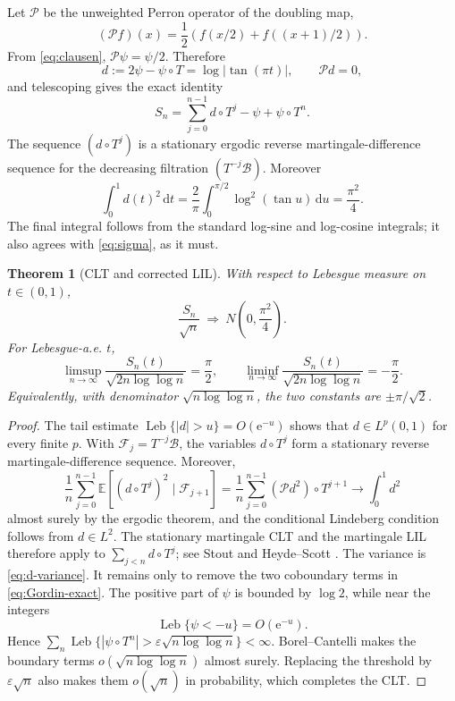 \documentclass[11pt,oneside]{article}
\newtheorem{theorem}{Theorem}[section]
\theoremstyle{definition}
\theoremstyle{remark}
\newcommand{\e}{\mathrm e}
\newcommand{\dd}{\,\mathrm d}
\begin{document}
Let $\mathcal P$ be the unweighted Perron operator of the doubling map,
\[
 (\mathcal P f)(x)=\frac12\left(f(x/2)+f((x+1)/2)\right).
\]
From \eqref{eq:clausen}, $\mathcal P\psi=\psi/2$.  Therefore
\begin{equation}
 d:=2\psi-\psi\circ T=\log|\tan(\pi t)|,
 \qquad \mathcal P d=0,
 \label{eq:martingale-difference}
\end{equation}
and telescoping gives the exact identity
\begin{equation}
 S_n=\sum_{j=0}^{n-1}d\circ T^j-\psi+\psi\circ T^n.
 \label{eq:Gordin-exact}
\end{equation}
The sequence $(d\circ T^j)$ is a stationary ergodic reverse martingale-difference sequence
for the decreasing filtration $(T^{-j}\mathcal B)$.  Moreover
\begin{equation}
 \int_0^1d(t)^2\dd t
 =\frac2\pi\int_0^{\pi/2}\log^2(\tan u)\dd u
 =\frac{\pi^2}{4}.
 \label{eq:d-variance}
\end{equation}
The final integral follows from the standard log-sine and log-cosine integrals; it also
agrees with \eqref{eq:sigma}, as it must.

\begin{theorem}[CLT and corrected LIL]
\label{thm:correct-lil}
With respect to Lebesgue measure on $t\in(0,1)$,
\begin{equation}
 \frac{S_n}{\sqrt n}\ \Longrightarrow\
 N\!\left(0,\frac{\pi^2}{4}\right).
 \label{eq:CLT}
\end{equation}
For Lebesgue-a.e. $t$,
\begin{equation}
 \limsup_{n\to\infty}\frac{S_n(t)}{\sqrt{2n\log\log n}}=\frac\pi2,
 \qquad
 \liminf_{n\to\infty}\frac{S_n(t)}{\sqrt{2n\log\log n}}=-\frac\pi2.
 \label{eq:LIL-correct}
\end{equation}
Equivalently, with denominator $\sqrt{n\log\log n}$, the two constants are
$\pm\pi/\sqrt2$.
\end{theorem}

\begin{proof}
The tail estimate $\operatorname{Leb}\{|d|>u\}=O(\e^{-u})$ shows that
$d\in L^p(0,1)$ for every finite $p$.  With
$\mathcal F_j=T^{-j}\mathcal B$, the variables $d\circ T^j$ form a stationary reverse
martingale-difference sequence.  Moreover,
\[
 \frac1n\sum_{j=0}^{n-1}
 \mathbb E\!\left[(d\circ T^j)^2\mid\mathcal F_{j+1}\right]
 =\frac1n\sum_{j=0}^{n-1}(\mathcal P d^2)\circ T^{j+1}
 \longrightarrow\int_0^1d^2
\]
almost surely by the ergodic theorem, and the conditional Lindeberg condition follows from
$d\in L^2$.  The stationary martingale CLT and the martingale LIL therefore apply to
$\sum_{j<n}d\circ T^j$; see Stout \cite{stout1970} and Heyde--Scott
\cite{heyde-scott1973}.  The variance is \eqref{eq:d-variance}.  It remains only to remove
the two coboundary terms in \eqref{eq:Gordin-exact}.  The positive part of $\psi$ is bounded
by $\log2$, while near the integers
\[
 \operatorname{Leb}\{\psi<-u\}=O(\e^{-u}).
\]
Hence
$\sum_n\operatorname{Leb}\{|\psi\circ T^n|>\varepsilon\sqrt{n\log\log n}\}<\infty$.
Borel--Cantelli makes the boundary terms $o(\sqrt{n\log\log n})$ almost surely.  Replacing
the threshold by $\varepsilon\sqrt n$ also makes them $o(\sqrt n)$ in probability, which
completes the CLT.
\end{proof}
\end{document}
